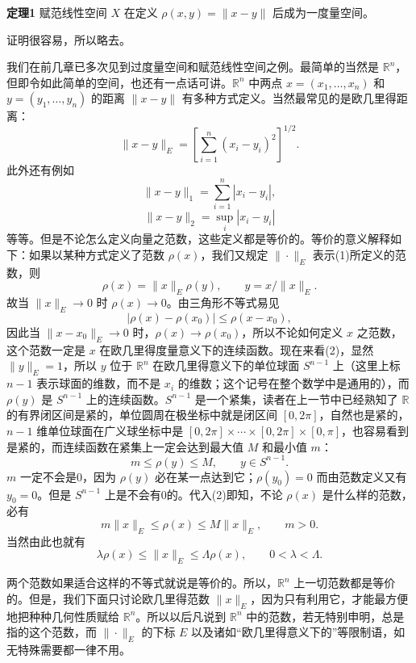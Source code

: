 \noindent\textbf{定理1}\quad
赋范线性空间 $X$ 在定义 $\rho(x,y)=\|x-y\|$ 后成为一度量空间。

证明很容易，所以略去。

我们在前几章已多次见到过度量空间和赋范线性空间之例。最简单的当然是 $\mathbb R^n$，但即令如此简单的空间，也还有一点话可讲。$\mathbb R^n$ 中两点 $x=(x_1,\ldots,x_n)$ 和 $y=(y_1,\ldots,y_n)$ 的距离 $\|x-y\|$ 有多种方式定义。当然最常见的是欧几里得距离：
\begin{equation}
 \|x-y\|_E=\left[\sum_{i=1}^n(x_i-y_i)^2\right]^{1/2}.
 \tag{1}
\end{equation}
此外还有例如
\[
 \|x-y\|_1=\sum_{i=1}^n|x_i-y_i|,
\]
\[
 \|x-y\|_2=\sup_i|x_i-y_i|
\]
等等。但是不论怎么定义向量之范数，这些定义都是等价的。等价的意义解释如下：如果以某种方式定义了范数 $\rho(x)$，我们又规定 $\|\cdot\|_E$ 表示(1)所定义的范数，则
\begin{equation}
 \rho(x)=\|x\|_E\rho(y),\qquad y=x/\|x\|_E.
 \tag{2}
\end{equation}
故当 $\|x\|_E\to0$ 时 $\rho(x)\to0$。由三角形不等式易见
\[
 |\rho(x)-\rho(x_0)|\le \rho(x-x_0),
\]
因此当 $\|x-x_0\|_E\to0$ 时，$\rho(x)\to\rho(x_0)$，所以不论如何定义 $x$ 之范数，这个范数一定是 $x$ 在欧几里得度量意义下的连续函数。现在来看(2)，显然 $\|y\|_E=1$，所以 $y$ 位于 $\mathbb R^n$ 在欧几里得意义下的单位球面 $S^{n-1}$ 上（这里上标 $n-1$ 表示球面的维数，而不是 $x_i$ 的维数；这个记号在整个数学中是通用的），而 $\rho(y)$ 是 $S^{n-1}$ 上的连续函数。$S^{n-1}$ 是一个紧集，读者在上一节中已经熟知了 $\mathbb R$ 的有界闭区间是紧的，单位圆周在极坐标中就是闭区间 $[0,2\pi]$，自然也是紧的，$n-1$ 维单位球面在广义球坐标中是 $[0,2\pi]\times\cdots\times[0,2\pi]\times[0,\pi]$，也容易看到是紧的，而连续函数在紧集上一定会达到最大值 $M$ 和最小值 $m$：
\[
 m\le \rho(y)\le M,\qquad y\in S^{n-1}.
\]
$m$ 一定不会是0，因为 $\rho(y)$ 必在某一点达到它；$\rho(y_0)=0$ 而由范数定义又有 $y_0=0$。但是 $S^{n-1}$ 上是不会有0的。代入(2)即知，不论 $\rho(x)$ 是什么样的范数，必有
\begin{equation}
 m\|x\|_E\le \rho(x)\le M\|x\|_E,\qquad m>0.
 \tag{3}
\end{equation}
当然由此也就有
\[
 \lambda\rho(x)\le \|x\|_E\le \Lambda\rho(x),\qquad 0<\lambda<\Lambda.
\]

两个范数如果适合这样的不等式就说是等价的。所以，$\mathbb R^n$ 上一切范数都是等价的。但是，我们下面只讨论欧几里得范数 $\|x\|_E$，因为只有利用它，才能最方便地把种种几何性质赋给 $\mathbb R^n$。所以以后凡说到 $\mathbb R^n$ 中的范数，若无特别申明，总是指的这个范数，而 $\|\cdot\|_E$ 的下标 $E$ 以及诸如“欧几里得意义下的”等限制语，如无特殊需要都一律不用。

